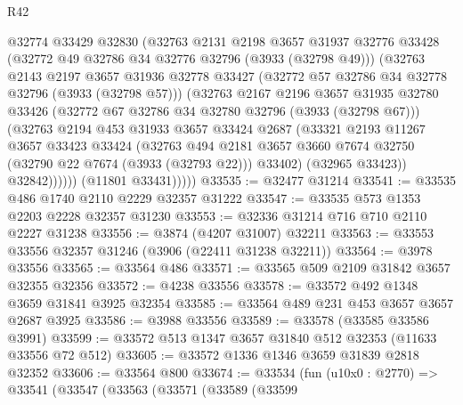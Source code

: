 \begin{lexlean}{R42}
\begin{coremodule}
                @32774
                @33429
                @32830
                (@32763
                  @2131
                  @2198
                  @3657
                  @31937
                  @32776
                  @33428
                  (@32772 @49 @32786 @34 @32776 @32796 (@3933 (@32798 @49)))
                  (@32763
                    @2143
                    @2197
                    @3657
                    @31936
                    @32778
                    @33427
                    (@32772 @57 @32786 @34 @32778 @32796 (@3933 (@32798 @57)))
                    (@32763
                      @2167
                      @2196
                      @3657
                      @31935
                      @32780
                      @33426
                      (@32772 @67 @32786 @34 @32780 @32796 (@3933 (@32798 @67)))
                      (@32763
                        @2194
                        @453
                        @31933
                        @3657
                        @33424
                        @2687
                        (@33321
                          @2193
                          @11267
                          @3657
                          @33423
                          @33424
                          (@32763
                            @494
                            @2181
                            @3657
                            @3660
                            @7674
                            @32750
                            (@32790 @22 @7674 (@3933 (@32793 @22)))
                            @33402)
                          (@32965 @33423))
                        @32842))))))
            (@11801 @33431)))))
@33535 := @32477 @31214
@33541 := @33535 @486 @1740 @2110 @2229 @32357 @31222
@33547 := @33535 @573 @1353 @2203 @2228 @32357 @31230
@33553 := @32336 @31214 @716 @710 @2110 @2227 @31238
@33556 := @3874 (@4207 @31007) @32211
@33563 := @33553 @33556 @32357 @31246 (@3906 (@22411 @31238 @32211))
@33564 := @3978 @33556
@33565 := @33564 @486
@33571 := @33565 @509 @2109 @31842 @3657 @32355 @32356
@33572 := @4238 @33556
@33578 := @33572 @492 @1348 @3659 @31841 @3925 @32354
@33585 := @33564 @489 @231 @453 @3657 @3657 @2687 @3925
@33586 := @3988 @33556
@33589 := @33578 (@33585 @33586 @3991)
@33599 := @33572 @513 @1347 @3657 @31840 @512 @32353 (@11633 @33556 @72 @512)
@33605 := @33572 @1336 @1346 @3659 @31839 @2818 @32352
@33606 := @33564 @800
@33674 := @33534
    (fun (u10x0 : @2770) =>
    @33541
      (@33547
        (@33563
          (@33571
            (@33589
              (@33599

\end{coremodule}
\end{lexlean}
